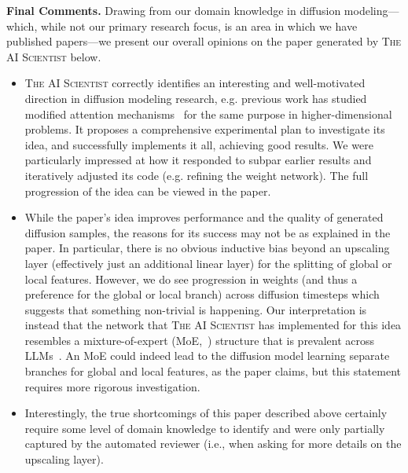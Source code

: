 \documentclass[11pt, a4paper]{include/gdm_format}
\newcommand{\ouralgo}{\textsc{The AI Scientist}\xspace}
\begin{document}
\begin{tcolorbox}[breakable,colback=green!5!white, colframe=green!75!black, title=Review - \texttt{adaptive\_dual\_scale\_denoising}]
{\small  }
\end{tcolorbox}

\textbf{Final Comments.}
%
Drawing from our domain knowledge in diffusion modeling—which, while not our primary research focus, is an area in which we have published papers—we present our overall opinions on the paper generated by \ouralgo below.
\begin{itemize}
\item \ouralgo correctly identifies an interesting and well-motivated direction in diffusion modeling research, e.g. previous work has studied modified attention mechanisms~\citep{hatamizadeh2024diffitdiffusionvisiontransformers} for the same purpose in higher-dimensional problems. It proposes a comprehensive experimental plan to investigate its idea, and successfully implements it all, achieving good results. We were particularly impressed at how it responded to subpar earlier results and iteratively adjusted its code (e.g. refining the weight network). The full progression of the idea can be viewed in the paper.
\item While the paper's idea improves performance and the quality of generated diffusion samples, the reasons for its success may not be as explained in the paper.
In particular, there is no obvious inductive bias beyond an upscaling layer (effectively just an additional linear layer) for the splitting of global or local features.
However, we do see progression in weights (and thus a preference for the global or local branch) across diffusion timesteps which suggests that something non-trivial is happening.
Our interpretation is instead that the network that \ouralgo has implemented for this idea resembles a mixture-of-expert (MoE,~\citet{yuksel2012twenty,switch_transformer}) structure that is prevalent across LLMs~\citep{jiang2024mixtralexperts}.
An MoE could indeed lead to the diffusion model learning separate branches for global and local features, as the paper claims, but this statement requires more rigorous investigation.
\item Interestingly, the true shortcomings of this paper described above certainly require some level of domain knowledge to identify and were only partially captured by the automated reviewer (i.e., when asking for more details on the upscaling layer).

\end{itemize}
\end{document}
